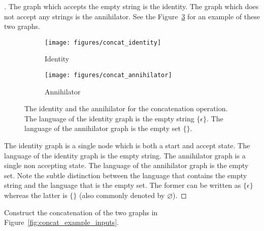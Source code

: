 \begin{proof}[\unskip\nopunct]
The graph which accepts the empty string is the identity. The graph which does
not accept any strings is the annihilator. See the
Figure~\ref{fig:concat_identity_annihilator} for an example of these two
graphs.

\begin{figure}
    \centering
    \begin{subfigure}[b]{0.48\textwidth}
        \centering
        \texttt{[image: figures/concat\_identity]}
        \caption{Identity}
        \label{fig:concat_identity}
    \end{subfigure}
    \begin{subfigure}[b]{0.48\textwidth}
        \centering
        \texttt{[image: figures/concat\_annihilator]}
        \caption{Annihilator}
        \label{fig:concat_annihilator}
    \end{subfigure}
    \caption{The identity and the annihilator for the concatenation operation.
    The language of the identity graph is the empty string $\{\epsilon\}$. The
    language of the annihilator graph is the empty set $\{\}$.}
    \label{fig:concat_identity_annihilator}
\end{figure}

The identity graph is a single node which is both a start and accept state. The
language of the identity graph is the empty string. The annihilator graph is a
single non accepting state. The language of the annihilator graph is the empty
set. Note the subtle distinction between the language that contains the empty
string and the language that is the empty set. The former can be written as
$\{\epsilon\}$ whereas the latter is $\{\}$ (also commonly denoted by
$\varnothing$).
\end{proof}

\begin{example}
Construct the concatenation of the two graphs in
Figure~\ref{fig:concat_example_inputs}.
\end{example}


